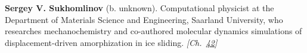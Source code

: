 \textbf{Sergey V. Sukhomlinov} (b. unknown). Computational physicist at the Department of Materials Science and Engineering, Saarland University, who researches mechanochemistry and co-authored molecular dynamics simulations of displacement-driven amorphization in ice sliding. \emph{[Ch.~\hyperref[ch:iceslipperiness]{42}]}

